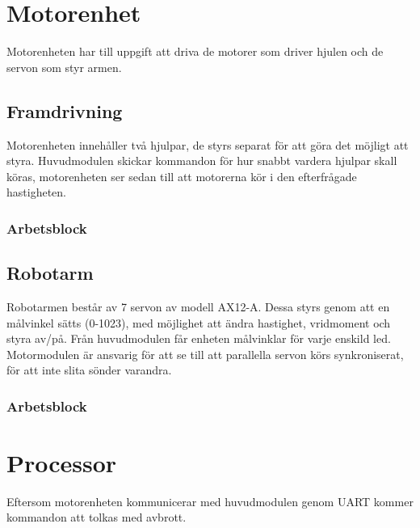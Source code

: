 \section{Motorenhet}

Motorenheten har till uppgift att driva de motorer som driver hjulen och de servon som styr armen.

\subsection{Framdrivning}

Motorenheten innehåller två hjulpar, de styrs separat för att göra det möjligt att styra. Huvudmodulen skickar kommandon för hur snabbt vardera hjulpar skall köras, motorenheten ser sedan till att motorerna kör i den efterfrågade hastigheten.

\subsubsection{Arbetsblock}


\subsection{Robotarm}

Robotarmen består av 7 servon av modell AX12-A. Dessa styrs genom att en målvinkel sätts (0-1023), med möjlighet att ändra hastighet, vridmoment och styra av/på. Från huvudmodulen får enheten målvinklar för varje enskild led. Motormodulen är ansvarig för att se till att parallella servon körs synkroniserat, för att inte slita sönder varandra.  


\subsubsection{Arbetsblock}


\section{Processor}

Eftersom motorenheten kommunicerar med huvudmodulen genom UART kommer kommandon att tolkas med avbrott.